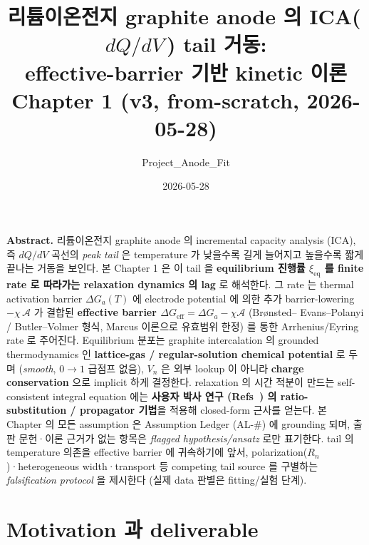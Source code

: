 \documentclass[11pt,a4paper]{article}
\title{\textbf{리튬이온전지 graphite anode 의 ICA(\,$dQ/dV$\,) tail 거동:\\
effective-barrier 기반 kinetic 이론}\\[0.4em]
\large Chapter 1 (v3, from-scratch, 2026-05-28)}
\author{Project\_Anode\_Fit}
\date{2026-05-28}
\newcommand{\eff}{\mathrm{eff}}
\newcommand{\eq}{\mathrm{eq}}
\begin{document}
\maketitle

\begin{center}\begin{minipage}{0.93\textwidth}
\small \textbf{Abstract.} 리튬이온전지 graphite anode 의 incremental capacity
analysis (ICA), 즉 $dQ/dV$ 곡선의 \emph{peak tail} 은 temperature 가 낮을수록
길게 늘어지고 높을수록 짧게 끝나는 거동을 보인다. 본 Chapter 1 은 이 tail 을
\textbf{equilibrium 진행률 $\xi_\eq$ 를 finite rate 로 따라가는 relaxation
dynamics 의 lag} 로 해석한다. 그 rate 는 thermal activation barrier $\Delta G_a(T)$
에 electrode potential 에 의한 추가 barrier-lowering $-\chi\,\mathcal A$ 가 결합된
\textbf{effective barrier $\Delta G_\eff = \Delta G_a - \chi\mathcal A$} (Brønsted--
Evans--Polanyi / Butler--Volmer 형식, Marcus 이론으로 유효범위 한정) 를 통한
Arrhenius/Eyring rate 로 주어진다. Equilibrium 분포는 graphite intercalation 의
grounded thermodynamics 인 \textbf{lattice-gas / regular-solution chemical
potential} 로 두며 (\emph{smooth}, $0\!\to\!1$ 급점프 없음), $V_n$ 은 외부 lookup 이
아니라 \textbf{charge conservation} 으로 implicit 하게 결정한다. relaxation 의 시간
적분이 만드는 self-consistent integral equation 에는 \textbf{사용자 박사 연구
(Refs~\cite{lee2011,son2013}) 의 ratio-substitution / propagator 기법}을 적용해
closed-form 근사를 얻는다. 본 Chapter 의 모든 assumption 은 Assumption Ledger
(AL-\#) 에 grounding 되며, 출판 문헌·이론 근거가 없는 항목은 \emph{flagged
hypothesis/ansatz} 로만 표기한다. tail 의 temperature 의존을 effective barrier 에
귀속하기에 앞서, polarization($R_n$)·heterogeneous width·transport 등 competing tail
source 를 구별하는 \emph{falsification protocol} 을 제시한다 (실제 data 판별은
fitting/실험 단계).
\end{minipage}\end{center}

\tableofcontents
\newpage

\section{Motivation 과 deliverable}\label{sec:intro}
\end{document}
